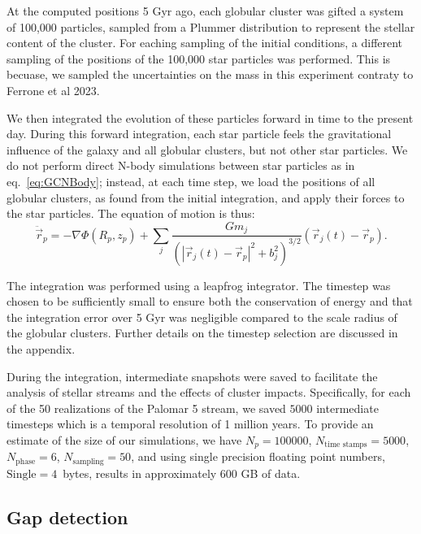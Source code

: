 \documentclass[draft]{aa}
\begin{document}
    At the computed positions 5 Gyr ago, each globular cluster was gifted a system of 100,000 particles, sampled from a Plummer distribution to represent the stellar content of the cluster. For eaching sampling of the initial conditions, a different sampling of the positions of the 100,000 star particles was performed. This is becuase, we sampled the uncertainties on the mass in this experiment contraty to Ferrone et al 2023. 
    
    We then integrated the evolution of these particles forward in time to the present day. During this forward integration, each star particle feels the gravitational influence of the galaxy and all globular clusters, but not other star particles. We do not perform direct N-body simulations between star particles as in eq.~\ref{eq:GCNBody}; instead, at each time step, we load the positions of all globular clusters, as found from the initial integration, and apply their forces to the star particles. The equation of motion is thus: 
    \begin{equation}
      \ddot{\vec{r}}_p = -\nabla \Phi(R_p,z_p) + \left.\sum_{j} \frac{Gm_j}{\left(|\vec{r}_j(t) - \vec{r}_p|^2 + b_j^2\right)^{3/2}}\right. \left(\vec{r}_j(t)- \vec{r}_p\right).
      \end{equation} \label{eq:equation_of_motion_particle}

    The integration was performed using a leapfrog integrator. The timestep was chosen to be sufficiently small to ensure both the conservation of energy and that the integration error over 5 Gyr was negligible compared to the scale radius of the globular clusters. Further details on the timestep selection are discussed in the appendix.

    During the integration, intermediate snapshots were saved to facilitate the analysis of stellar streams and the effects of cluster impacts. Specifically, for each of the 50 realizations of the Palomar 5 stream, we saved $5000$ intermediate timesteps which is a temporal resolution of 1 million years. To provide an estimate of the size of our simulations, we have $N_p=100 000$, $N_\textrm{time stamps} = 5 000$, $N_\textrm{phase}=6$, $N_\textrm{sampling}=50$, and using single precision floating point numbers, $\textrm{Single}=4$~bytes, results in approximately 600 GB of data.




  \subsection{Gap detection} \label{sec:gap_detection}
\end{document}
